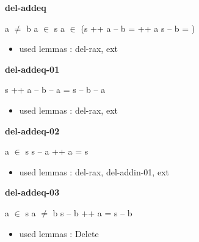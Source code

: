 \documentclass[a4paper]{article}
\begin{document}
\raggedright
              
\bigskip

{\large\bf del-addeq}

\medskip

 \Fol a $\neq$ b \And \Not a $\in$ s \And \Not a $\in$  \Imp (s ++ a -- b =  ++ a \Equiv s -- b = )

\begin{itemize}


\item       used lemmas  : del-rax, ext

\end{itemize}

\medskip

\bigskip

{\large\bf del-addeq-01}

\medskip

 \Fol s ++ a -- b -- a = s -- b -- a

\begin{itemize}


\item       used lemmas  : del-rax, ext

\end{itemize}

\medskip

\bigskip

{\large\bf del-addeq-02}

\medskip

 \Fol a $\in$ s \Imp s -- a ++ a = s

\begin{itemize}


\item       used lemmas  : del-rax, del-addin-01, ext

\end{itemize}

\medskip

\bigskip

{\large\bf del-addeq-03}

\medskip

 \Fol a $\in$ s \And a $\neq$ b \Imp s -- b ++ a = s -- b

\begin{itemize}


\item       used lemmas  : Delete

\end{itemize}

\medskip
\end{document}
